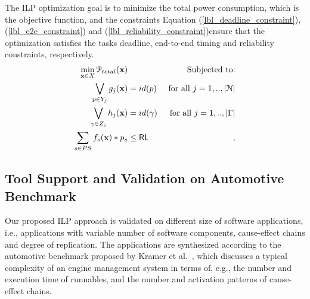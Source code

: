 The ILP optimization goal is to minimize the total power consumption, which is the objective function, and the constraints Equation (\ref{lbl_deadline_constraint}), (\ref{lbl_e2e_constraint}) and (\ref{lbl_reliability_constraint})ensure that the optimization satisfies the tasks deadline, end-to-end timing and reliability constraints, respectively.
\begin{align}
\label{eqn_const_func}
\min_{\x\in X} \mathcal{P}_{total}(\x) && \text{ Subjected to:}\\
\label{lbl_deadline_constraint} 
\bigvee\limits_{p\in Y_j} g_j (\x) &= id(p)& \mbox{ for all } j=1,..,|\mathcal{N}|\\ 
\label{lbl_e2e_constraint}
\bigvee\limits_{\gamma\in Z_j} h_j (\x) &= id(\gamma) & \mbox{ for all } j=1,..,|\Gamma|\\ 
\label{lbl_reliability_constraint}
\sum_{s\in PS}f_s(\x)*p_s &\leq \RL&,
\end{align}

\subsection*{Tool Support and Validation on Automotive Benchmark}
Our proposed ILP approach is validated on different size of software applications, i.e., applications with variable number of software components, cause-effect chains and degree of replication. The applications are synthesized according to the automotive benchmark proposed by Kramer et al.~\cite{Kramer2015RealFree}, which discusses a typical complexity of an \autosar{} engine management system in terms of, e.g., the number and execution time of runnables, and the number and activation patterns of cause-effect chains. 

